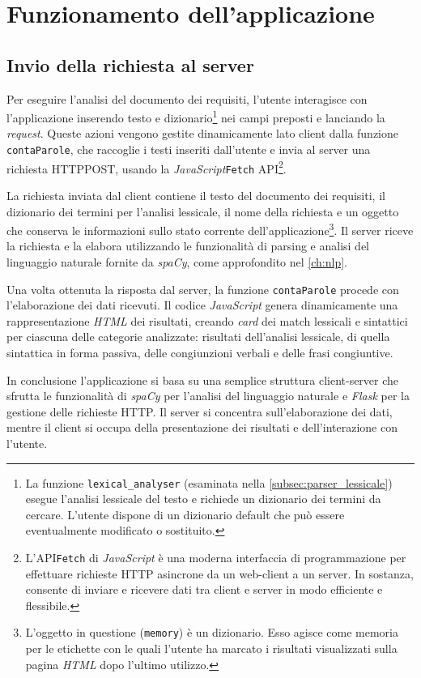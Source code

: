 \documentclass[12pt]{report}
\newcommand{\javascript}{\textsl{JavaScript}\xspace}
\newcommand{\flask}{\textsl{Flask}\xspace}
\newcommand{\spacy}{\textsl{spaCy}\xspace}
\newcommand{\html}{\textsl{HTML}\xspace}
\newcommand{\api}{\textsf{API}\xspace}
\newcommand{\http}{\textsf{HTTP}\xspace}
\newcommand{\post}{\textsf{POST}\xspace}
\begin{document}
\section{Funzionamento dell'applicazione}
\subsection{Invio della richiesta al server}
Per eseguire l'analisi del documento dei requisiti, l'utente interagisce con l'applicazione inserendo testo e dizionario\footnote{La funzione \texttt{lexical\_analyser} (esaminata nella \cref{subsec:parser_lessicale}) esegue l'analisi lessicale del testo e richiede un dizionario dei termini da cercare. L'utente dispone di un dizionario default che può essere eventualmente modificato o sostituito.} nei campi preposti e lanciando la \textit{request}. Queste azioni vengono gestite dinamicamente lato client dalla funzione \texttt{contaParole}, che raccoglie i testi inseriti dall'utente e invia al server una richiesta \http \post, usando la \javascript \texttt{Fetch} \api\footnote{L'\api \texttt{Fetch} di \javascript è una moderna interfaccia di programmazione per effettuare richieste \http asincrone da un web-client a un server. In sostanza, consente di inviare e ricevere dati tra client e server in modo efficiente e flessibile.}.

La richiesta inviata dal client contiene il testo del documento dei requisiti, il dizionario dei termini per l'analisi lessicale, il nome della richiesta e un oggetto che conserva le informazioni sullo stato corrente dell'applicazione\footnote{L'oggetto in questione (\texttt{memory}) è un dizionario. Esso agisce come memoria per le etichette con le quali l'utente ha marcato i risultati visualizzati sulla pagina \html dopo l'ultimo utilizzo.}. Il server riceve la richiesta e la elabora utilizzando le funzionalità di parsing e analisi del linguaggio naturale fornite da \spacy, come approfondito nel \cref{ch:nlp}.

Una volta ottenuta la risposta dal server, la funzione \texttt{contaParole} procede con l'elaborazione dei dati ricevuti. Il codice \javascript genera dinamicamente una rappresentazione \html dei risultati, creando \textit{card} dei match lessicali e sintattici per ciascuna delle categorie analizzate: risultati dell'analisi lessicale, di quella sintattica in forma passiva, delle congiunzioni verbali e delle frasi congiuntive.

In conclusione l'applicazione si basa su una semplice struttura client-server che sfrutta le funzionalità di \spacy per l'analisi del linguaggio naturale e \flask per la gestione delle richieste \http. Il server si concentra sull'elaborazione dei dati, mentre il client si occupa della presentazione dei risultati e dell'interazione con l'utente.
\end{document}
